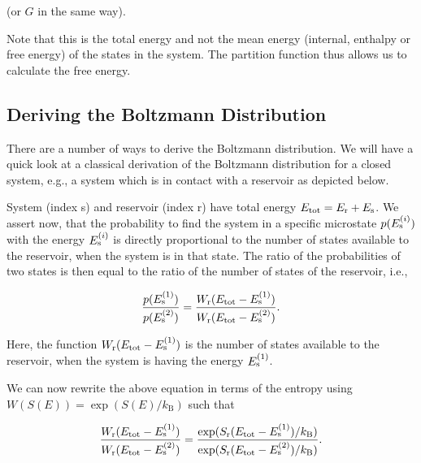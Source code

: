 \documentclass[letterpaper,10pt,english]{sphinxmanual}
\let\sphinxpxdimen\pdfpxdimen\else\newdimen\sphinxpxdimen
\begin{document}
\sphinxAtStartPar
(or \(G\) in the same way).

\sphinxAtStartPar
Note that this is the total energy and not the mean energy (internal, enthalpy or free energy) of the states in the system. The partition function thus allows us to calculate the free energy.


\subsection{Deriving the Boltzmann Distribution}
\label{\detokenize{notebooks/L2/3_Statistical_Physics_Definitions:Deriving-the-Boltzmann-Distribution}}
\sphinxAtStartPar
There are a number of ways to derive the Boltzmann distribution. We will have a quick look at a classical derivation of the Boltzmann distribution for a closed system, e.g., a system which is in contact with a reservoir as depicted below.

\noindent\sphinxincludegraphics[width=186\sphinxpxdimen,height=200\sphinxpxdimen]{{entropy_calc}.png}

\sphinxAtStartPar
System (index s) and reservoir (index r) have total energy \(E_{\rm tot}=E_{\rm r}+E_{\rm s}\). We assert now, that the probability to find the system in a specific microstate \(p(E_{\rm s}^{(i)})\) with the energy \(E_{\rm s}^{(i)}\) is directly proportional to the number of states available to the reservoir, when the system is in that state. The ratio of the probabilities of two states is then equal to the ratio of the number of states of the reservoir, i.e.,

\sphinxAtStartPar
\begin{equation}
\frac{p(E_{\rm s}^{(1)})}{p(E_{\rm s}^{(2)})}=\frac{W_{\rm r}(E_{\rm tot}-E_{\rm s}^{(1)})}{W_{\rm r}(E_{\rm tot}-E_{\rm s}^{(2)})}.
\end{equation}

\sphinxAtStartPar
Here, the function \(W_{\rm r}(E_{\rm tot}-E_{\rm s}^{(1)})\) is the number of states available to the reservoir, when the system is having the energy \(E_{\rm s}^{(1)}\).

\sphinxAtStartPar
We can now rewrite the above equation in terms of the entropy using \(W(S(E))=\exp(S(E)/k_\mathrm{B})\) such that

\sphinxAtStartPar
\begin{equation}
\frac{W_{\rm r}(E_{\rm tot}-E_{\rm s}^{(1)})}{W_{\rm r}(E_{\rm tot}-E_{\rm s}^{(2)})}=\frac{\exp(S_{\rm r}(E_{\rm tot}-E_{\rm s}^{(1)})/k_{\rm B})}{\exp(S_{\rm r}(E_{\rm tot}-E_{\rm s}^{(2)})/k_{\rm B})}.
\end{equation}
\end{document}
